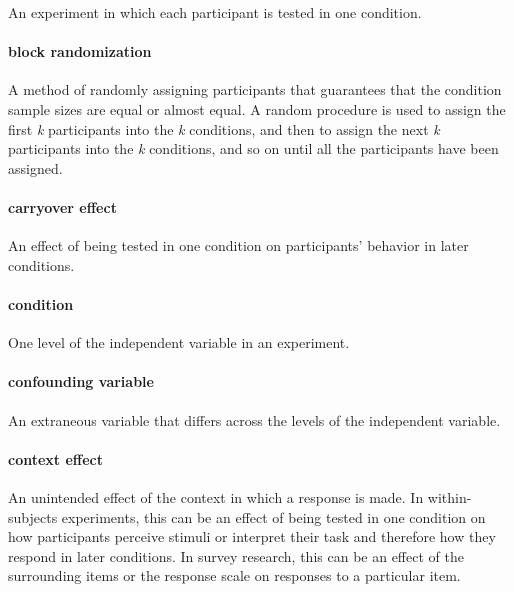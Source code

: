 \documentclass[
]{krantz}
\begin{document}
An experiment in which each participant is tested in one condition.

\paragraph*{block randomization}\label{block-randomization}

A method of randomly assigning participants that guarantees that the condition sample sizes are equal or almost equal. A random procedure is used to assign the first \emph{k} participants into the \emph{k} conditions, and then to assign the next \emph{k} participants into the \emph{k} conditions, and so on until all the participants have been assigned.

\paragraph*{carryover effect}\label{carryover-effect}

An effect of being tested in one condition on participants' behavior in later conditions.

\paragraph*{condition}\label{condition}

One level of the independent variable in an experiment.

\paragraph*{confounding variable}\label{confounding-variable}

An extraneous variable that differs across the levels of the independent variable.

\paragraph*{context effect}\label{context-effect}

An unintended effect of the context in which a response is made. In within-subjects experiments, this can be an effect of being tested in one condition on how participants perceive stimuli or interpret their task and therefore how they respond in later conditions. In survey research, this can be an effect of the surrounding items or the response scale on responses to a particular item.
\end{document}
